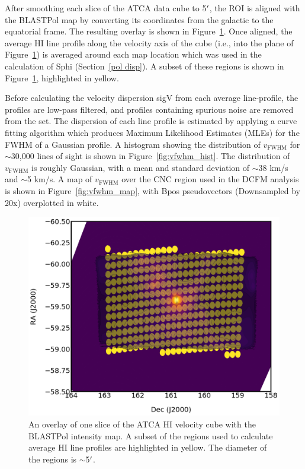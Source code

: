 After smoothing each slice of the ATCA data cube to 5$\operatorname{^{\prime}}$, the ROI is aligned with the BLASTPol map by converting its coordinates from the galactic to the equatorial frame. The resulting overlay is shown in Figure~\ref{fig:HI_vselect}. Once aligned, the average $\mathrm{HI}$ line profile along the velocity axis of the cube (i.e., into the plane of Figure~\ref{fig:HI_vselect}) is averaged around each map location which was used in the calculation of \gls{Sphi} (Section~\ref{pol disp}). A subset of these regions is shown in Figure~\ref{fig:HI_vselect}, highlighted in yellow.

Before calculating the velocity dispersion \gls{sigV} from each average line-profile, the profiles are low-pass filtered, and profiles containing spurious noise are removed from the set. The dispersion of each line profile is estimated by applying a curve fitting algorithm which produces Maximum Likelihood Estimates (MLEs) for the FWHM of a Gaussian profile. A histogram showing the distribution of $v_{\mathrm{FWHM}}$ for $\sim$30,000 lines of sight is shown in Figure~\ref{fig:vfwhm_hist}. The distribution of $v_{\mathrm{FWHM}}$ is roughly Gaussian, with a mean and standard deviation of $\sim$38 km/s and $\sim$5 km/s. A map of $v_{\mathrm{FWHM}}$ over the CNC region used in the DCFM analysis is shown in Figure~\ref{fig:vfwhm_map}, with \gls{Bpos} pseudovectors (Downsampled by 20x) overplotted in white.

\begin{figure}[!htbp]
\centering
\includegraphics[width=\textwidth]{figures/carina/HI_vselect}
\caption[~An overlay of one slice of the ATCA HI velocity cube with the BLASTPol intensity map.]{An overlay of one slice of the ATCA $\mathrm{HI}$ velocity cube with the BLASTPol intensity map. A subset of the regions used to calculate average HI line profiles are highlighted in yellow. The diameter of the regions is $\sim$5$\operatorname{^{\prime}}$.}
\label{fig:HI_vselect}
\end{figure}

